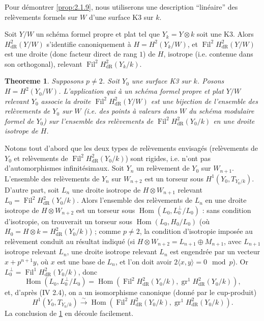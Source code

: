 \documentclass[12pt,a4paper]{article}
\theoremstyle{plain}
\newtheorem{theorem}{Theoreme}[section]
\theoremstyle{definition}
\theoremstyle{remark}
\DeclareMathOperator{\Fil}{Fil}
\DeclareMathOperator{\gr}{gr}
\DeclareMathOperator{\Hom}{Hom}
\providecommand{\Hom}{\operatorname{Hom}}
\begin{document}
\subsubsection{}
Pour d\'emontrer \ref{prop:2.1.9}, nous utiliserons une description ``lin\'eaire'' des rel\`evements formels sur $W$ d'une surface K3 sur $k$.

Soit $Y/W$ un sch\'ema formel propre et plat tel que $Y_k = Y \otimes k$ soit une K3. Alors $H^2_\mathrm{dR}(Y/W)$ s'identifie canoniquement \`a $H = H^2(Y_k/W)$, et $\Fil^2 H^2_\mathrm{dR}(Y/W)$ est une droite (donc facteur direct de rang $1$) de $H$, isotrope (i.e. contenue dans son orthogonal), relevant $\Fil^2 H^2_\mathrm{dR}(Y_k/k)$.

\begin{theorem}\label{thm:2.1.11}
Supposons $p \neq 2$. Soit $Y_0$ une surface K3 sur $k$. Posons $H = H^2(Y_0/W)$. L'application qui \`a un sch\'ema formel propre et plat $Y/W$ relevant $Y_0$ associe la droite $\Fil^2 H^2_\mathrm{dR}(Y/W)$ est une bijection de l'ensemble des rel\`evements de $Y_0$ sur $W$ (i.e. des points \`a valeurs dans $W$ du sch\'ema modulaire formel de $Y_0$) sur l'ensemble des rel\`evements de $\Fil^2 H^2_\mathrm{dR}(Y_0/k)$ en une droite isotrope de $H$.
\end{theorem}

Notons tout d'abord que les deux types de rel\`evements envisag\'es (rel\`evements de $Y_0$ et rel\`evements de $\Fil^2 H^2_\mathrm{dR}(Y_0/k)$) sont rigides, i.e. n'ont pas d'automorphismes infinit\'esimaux. Soit $Y_n$ un rel\`evement de $Y_0$ sur $W_{n+1}$. L'ensemble des rel\`evements de $Y_n$ sur $W_{n+2}$ est un torseur sous $H^1(Y_0, T_{Y_0/k})$. D'autre part, soit $L_n$ une droite isotrope de $H \otimes W_{n+1}$ relevant $L_0 = \Fil^2 H^2_\mathrm{dR}(Y_0/k)$. Alors l'ensemble des rel\`evements de $L_n$ en une droite isotrope de $H \otimes W_{n+2}$ est un torseur sous $\Hom(L_0, L_0^\perp/L_0)$ : sans condition d'isotropie, on trouverait un torseur sous $\Hom(L_0, H_0/L_0)$ (o\`u $H_0 = H \otimes k = H^2_\mathrm{dR}(Y_0/k)$) ; comme $p \neq 2$, la condition d'isotropie impos\'ee au rel\`evement conduit au r\'esultat indiqu\'e (si $H \otimes W_{n+2} = L_{n+1} \oplus M_{n+1}$, avec $L_{n+1}$ isotrope relevant $L_n$, une droite isotrope relevant $L_n$ est engendr\'ee par un vecteur $x + p^{n+1}y$, o\`u $x$ est une base de $L_n$, et l'on doit avoir $2\langle x, y \rangle = 0 \mod p$). Or $L_0^\perp = \Fil^1 H^2_\mathrm{dR}(Y_0/k)$, donc
\[
\Hom(L_0, L_0^\perp/L_0) = \Hom(\Fil^2 H^2_\mathrm{dR}(Y_0/k), \gr^1 H^2_\mathrm{dR}(Y_0/k)),
\]
et, d'apr\`es (IV 2.4), on a un isomorphisme canonique (donn\'e par le cup-produit)
\[
H^1(Y_0, T_{Y_0/k}) \xrightarrow{\sim} \Hom(\Fil^2 H^2_\mathrm{dR}(Y_0/k), \gr^1 H^2_\mathrm{dR}(Y_0/k)).
\]
La conclusion de \ref{thm:2.1.11} en d\'ecoule facilement.
\end{document}
